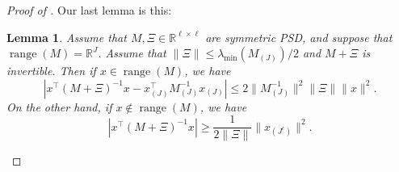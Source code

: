 \documentclass{article} %
\newcommand{\R}{\mathbb{R}}
\DeclareMathOperator{\range}{range}
\newtheorem{lemma}[lemma]{Lemma}
\begin{document}
\begin{proof}[Proof of ]
Our last lemma is this:

\begin{lemma}\label{lemma:l4}
    Assume that $M,\Xi \in \R^{\ell\times\ell}$ are symmetric PSD, and suppose that $\range(M)=\R^J$. Assume that $\|\Xi\|\leq \lambda_{\min}(M_{(J)})/2$ and $M+\Xi$ is invertible. Then if $x\in \range(M)$, we have
    \[
    \left|x^\top (M+\Xi)^{-1}x -  x_{(J)}^\top M_{(J)}^{-1}x_{(J)}\right| \leq 2 \|M_{(J)}^{-1}\|^2 \|\Xi\| \|x\|^2.
    \]
    On the other hand, if $x\not\in \range(M)$, we have
    \[
    \left|x^\top (M+\Xi)^{-1}x\right| \geq \frac{1}{2\|\Xi\|} \|x_{(J^c)}\|^2.
    \]
\end{lemma}
    


\end{proof}
\end{document}
